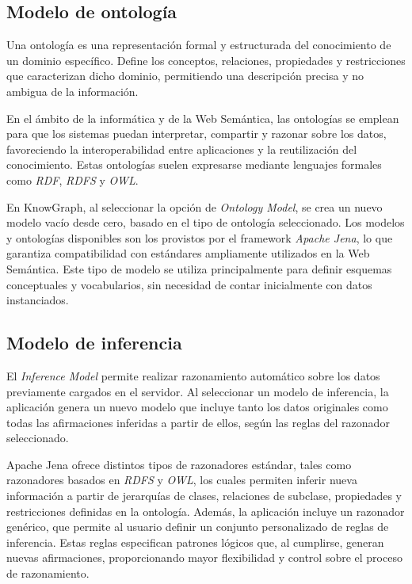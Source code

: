 \documentclass{article}
\begin{document}
\subsection{Modelo de ontología}
Una ontología es una representación formal y estructurada del conocimiento de un dominio específico. Define los conceptos, relaciones, propiedades y restricciones que caracterizan dicho dominio, permitiendo una descripción precisa y no ambigua de la información.

En el ámbito de la informática y de la Web Semántica, las ontologías se emplean para que los sistemas puedan interpretar, compartir y razonar sobre los datos, favoreciendo la interoperabilidad entre aplicaciones y la reutilización del conocimiento. Estas ontologías suelen expresarse mediante lenguajes formales como \textit{RDF}, \textit{RDFS} y \textit{OWL}.

En KnowGraph, al seleccionar la opción de \textit{Ontology Model}, se crea un nuevo modelo vacío desde cero, basado en el tipo de ontología seleccionado. Los modelos y ontologías disponibles son los provistos por el framework \textit{Apache Jena}, lo que garantiza compatibilidad con estándares ampliamente utilizados en la Web Semántica. Este tipo de modelo se utiliza principalmente para definir esquemas conceptuales y vocabularios, sin necesidad de contar inicialmente con datos instanciados.

\subsection{Modelo de inferencia}
El \textit{Inference Model} permite realizar razonamiento automático sobre los datos previamente cargados en el servidor. Al seleccionar un modelo de inferencia, la aplicación genera un nuevo modelo que incluye tanto los datos originales como todas las afirmaciones inferidas a partir de ellos, según las reglas del razonador seleccionado.

Apache Jena ofrece distintos tipos de razonadores estándar, tales como razonadores basados en \textit{RDFS} y \textit{OWL}, los cuales permiten inferir nueva información a partir de jerarquías de clases, relaciones de subclase, propiedades y restricciones definidas en la ontología. Además, la aplicación incluye un razonador genérico, que permite al usuario definir un conjunto personalizado de reglas de inferencia. Estas reglas especifican patrones lógicos que, al cumplirse, generan nuevas afirmaciones, proporcionando mayor flexibilidad y control sobre el proceso de razonamiento.
\end{document}
